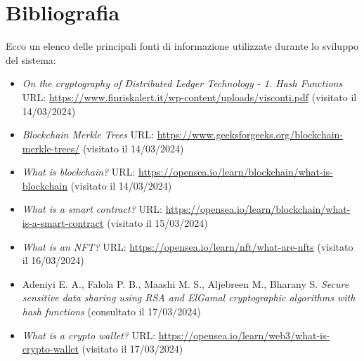 \documentclass[a4paper, 12pt, italian]{extarticle}
\begin{document}
\section{Bibliografia}
Ecco un elenco delle principali fonti di informazione utilizzate durante lo sviluppo del sistema:
\begin{itemize}[topsep=5pt, itemsep=0pt]
    \item
    \textit{On the cryptography of Distributed Ledger Technology - 1. Hash Functions}\newline
    URL: \url{https://www.finriskalert.it/wp-content/uploads/visconti.pdf}\newline
    (visitato il 14/03/2024)
    
    \item
    \textit{Blockchain Merkle Trees}\newline
    URL: \url{https://www.geeksforgeeks.org/blockchain-merkle-trees/}\newline
    (visitato il 14/03/2024)

    \item
    \textit{What is blockchain?}\newline
    URL: \url{https://opensea.io/learn/blockchain/what-is-blockchain}\newline
    (visitato il 14/03/2024)

    \item
    \textit{What is a smart contract?}\newline
    URL: \url{https://opensea.io/learn/blockchain/what-is-a-smart-contract}\newline
    (visitato il 15/03/2024)

    \item
    \textit{What is an NFT?}\newline
    URL: \url{https://opensea.io/learn/nft/what-are-nfts}\newline
    (visitato il 16/03/2024)

    \item
    Adeniyi E. A., Falola P. B., Maashi M. S., Aljebreen M., Bharany S.\newline
    \textit{Secure sensitive data sharing using RSA and ElGamal cryptographic algorithms with hash functions} (consultato il 17/03/2024)

    \item
    \textit{What is a crypto wallet?}\newline
    URL: \url{https://opensea.io/learn/web3/what-is-crypto-wallet}\newline
    (visitato il 17/03/2024)


\end{itemize}
\end{document}
